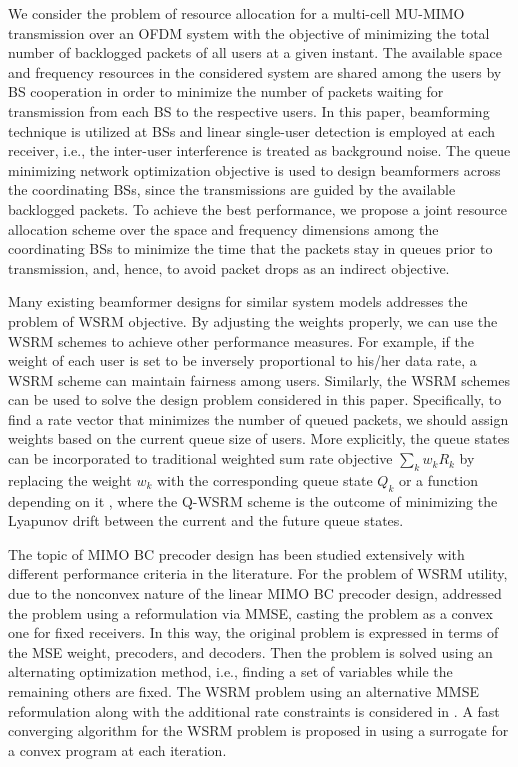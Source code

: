 We consider the problem of resource allocation for a multi-cell \ac{MU-MIMO} transmission over an \ac{OFDM} system with the objective of minimizing the total number of backlogged packets of all users at a given instant. The available space and frequency resources in the considered system are shared among the users by \ac{BS} cooperation in order to minimize the number of packets waiting for transmission from each \ac{BS} to the respective users. In this paper, beamforming technique is utilized at \acp{BS} and linear single-user detection is employed at each receiver, i.e., the inter-user interference is treated as background noise. The queue minimizing network optimization objective is used to design beamformers across the coordinating \acp{BS}, since the transmissions are guided by the available backlogged packets. To achieve the best performance, we propose a joint resource allocation scheme over the space and frequency dimensions among the coordinating \acp{BS} to minimize the time that the packets stay in queues prior to transmission, and, hence, to avoid packet drops as an indirect objective.

Many existing beamformer designs for similar system models addresses the problem of \ac{WSRM} objective. By adjusting the weights properly, we can use the \ac{WSRM} schemes to achieve other performance measures. For example, if the weight of each user is set to be inversely proportional to his/her data rate, a \ac{WSRM} scheme can maintain fairness among users. Similarly, the \ac{WSRM} schemes can be used to solve the design problem considered in this paper. Specifically, to find a rate vector that minimizes the number of queued packets, we should assign weights based on the current queue size of users. More explicitly, the queue states can be incorporated to traditional weighted sum rate objective $\sum_k w_k R_k$ by replacing the weight $w_k$ with the corresponding queue state $Q_k$ or a function depending on it \cite{neely2010stochastic}, where the \ac{Q-WSRM} scheme is the outcome of minimizing the Lyapunov drift between the current and the future queue states.

The topic of \ac{MIMO} \ac{BC} precoder design has been studied extensively with different performance criteria in the literature. For the problem of \ac{WSRM} utility, due to the nonconvex nature of the linear \ac{MIMO} \ac{BC} precoder design, \cite{christensen2008weighted,wmmse_shi} addressed the problem using a reformulation via \ac{MMSE}, casting the problem as a convex one for  fixed receivers. In this way, the original problem is expressed in terms of the \ac{MSE} weight, precoders, and decoders. Then the problem is solved using an alternating optimization method, i.e., finding a set of variables while the remaining others are fixed. The \ac{WSRM} problem using an alternative \ac{MMSE} reformulation along with the additional rate constraints is considered in \cite{kaleva2013primal}. A fast converging algorithm for the \ac{WSRM} problem is proposed in \cite{tran2012fast} using a surrogate for a convex program at each iteration.

